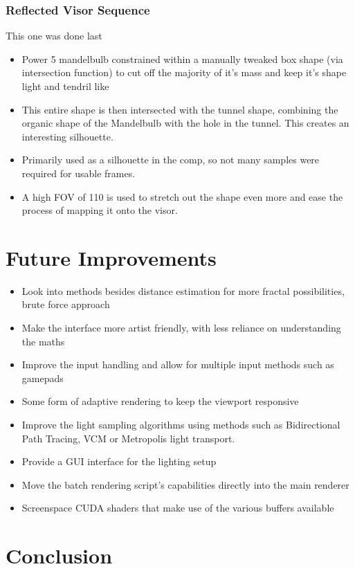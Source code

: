 \documentclass[11pt,a4paper,final,notitlepage]{report}
\begin{document}
\subsection{Reflected Visor Sequence}
This one was done last

\begin{itemize}
\item Power 5 mandelbulb constrained within a manually tweaked box shape (via intersection function)
to cut off the majority of it’s mass and keep it’s shape light and tendril like
\item This entire shape is then intersected with the tunnel shape, combining the organic shape of
the Mandelbulb with the hole in the tunnel. This creates an interesting silhouette.
\item Primarily used as a silhouette in the comp, so not many samples were required for usable
frames.
\item A high FOV of 110 is used to stretch out the shape even more and ease the process of mapping
it onto the visor.
\end{itemize}

\chapter{Future Improvements}

\begin{itemize}
	\item Look into methods besides distance estimation for more fractal possibilities, brute force approach
	\item Make the interface more artist friendly, with less reliance on understanding the maths
	\item Improve the input handling and allow for multiple input methods such as gamepads
	\item Some form of adaptive rendering to keep the viewport responsive
	\item Improve the light sampling algorithms using methods such as Bidirectional Path Tracing, VCM or Metropolis light transport.
	\item Provide a GUI interface for the lighting setup
	\item Move the batch rendering script's capabilities directly into the main renderer
	\item Screenspace CUDA shaders that make use of the various buffers available	
\end{itemize}


\chapter{Conclusion}
\end{document}
